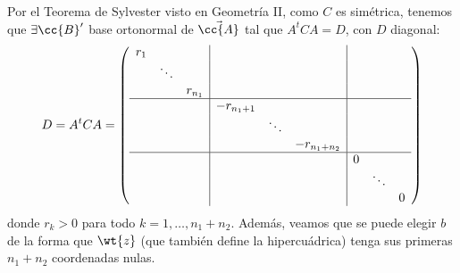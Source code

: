 Por el Teorema de Sylvester visto en Geometría II, como $C$ es simétrica, tenemos que $\exists \cc{B}'$ base ortonormal de $\vec{\cc{A}}$ tal que $A^tCA=D$, con $D$ diagonal:
\begin{equation*}
    D=A^tCA = \left(
    \begin{array}{ccc|ccc|ccc}
       r_1&&&&&&&& \\
       & \ddots&&&&&&&\\
       && r_{n_1}&&&&&&\\ \hline
       &&& -r_{n_1+1}&&&&&\\
       &&&& \ddots&&&&\\
       &&&&& -r_{n_1+n_2}&&&\\ \hline
       &&&&&& 0&&\\
       &&&&&&& \ddots &\\
       &&&&&&&& 0
    \end{array}
    \right)
\end{equation*}
donde $r_k>0$ para todo $k=1,\dots,n_1+n_2$. Además, veamos que se puede elegir $b$ de la forma que $\wt{z}$ (que también define la hipercuádrica) tenga sus primeras $n_1+n_2$ coordenadas nulas.
\begin{comment}
Tenemos que $A^tz$ es un vector columna, por lo que sea $A^tz=\lm$:
\begin{equation*}
    \left(\begin{array}{c}
        0 \\ \vdots \\ 0 \\ z_{n_1+n_2+1} \\ \vdots \\ z_n
    \end{array}\right) = \wt{z}= A^tz+A^tCb = \lm+DA^tb = \left(\begin{array}{c}
        \lm_1 \\ \vdots \\ \lm_{n_1+n_2} \\ \lm_{n_1+n_2+1} \\ \vdots \\ \lm_n
    \end{array}\right)+DA^tb
\end{equation*}
\end{comment}


